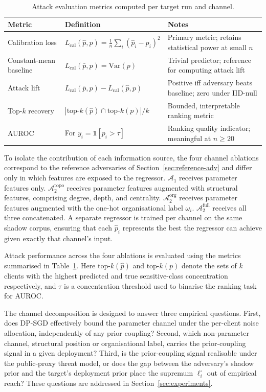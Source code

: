 \documentclass[letterpaper,journal]{IEEEtran}
\begin{document}
\begin{table}[t]
\centering
\caption{Attack evaluation metrics computed per target run and
channel.}
\label{tab:metrics}
\begin{tabular}{@{}lll@{}}
\toprule
Metric & Definition & Notes \\
\midrule
Calibration loss &
$L_{\text{cal}}(\hat{p}, p) = \frac{1}{n}\sum_i (\hat{p}_i - p_i)^2$ &
Primary metric; retains statistical power at small $n$ \\
Constant-mean baseline &
$L_{\text{cal}}(\bar{p}, p) = \mathrm{Var}(p)$ &
Trivial predictor; reference for computing attack lift \\
Attack lift &
$L_{\text{cal}}(\bar{p}, p) - L_{\text{cal}}(\hat{p}, p)$ &
Positive iff adversary beats baseline; zero under IID-null \\
Top-$k$ recovery &
$|\text{top-}k(\hat{p}) \cap \text{top-}k(p)| / k$ &
Bounded, interpretable ranking metric \\
AUROC &
For $y_i = \mathbb{1}[p_i > \tau]$ &
Ranking quality indicator; meaningful at $n \geq 20$ \\
\bottomrule
\end{tabular}
\end{table}

To isolate the contribution of each information source, the four
channel ablations correspond to the reference adversaries of
Section~\ref{sec:reference-adv} and differ only in which features
are exposed to the regressor. $\mathcal{A}_1$ receives parameter
features only. $\mathcal{A}_2^{\text{topo}}$ receives parameter
features augmented with structural features, comprising degree,
depth, and centrality. $\mathcal{A}_2^{\text{org}}$ receives
parameter features augmented with the one-hot organisational label
$\omega_i$. $\mathcal{A}_2^{\text{full}}$ receives all three
concatenated. A separate regressor is trained per channel on the
same shadow corpus, ensuring that each $\hat{p}_i$ represents the
best the regressor can achieve given exactly that channel's input.

Attack performance across the four ablations is evaluated using the
metrics summarised in Table~\ref{tab:metrics}. Here
$\text{top-}k(\hat{p})$ and $\text{top-}k(p)$ denote the sets of
$k$ clients with the highest predicted and true sensitive-class
concentration respectively, and $\tau$ is a concentration threshold
used to binarise the ranking task for AUROC.

The channel decomposition is designed to answer three empirical
questions. First, does DP-SGD effectively bound the parameter
channel under the per-client noise allocation, independently of any
prior coupling? Second, which non-parameter channel, structural
position or organisational label, carries the prior-coupling signal
in a given deployment? Third, is the prior-coupling signal
realisable under the public-proxy threat model, or does the gap
between the adversary's shadow prior and the target's deployment
prior place the supremum $\ell_i^\circ$ out of empirical reach?
These questions are addressed in Section~\ref{sec:experiments}.
\end{document}
